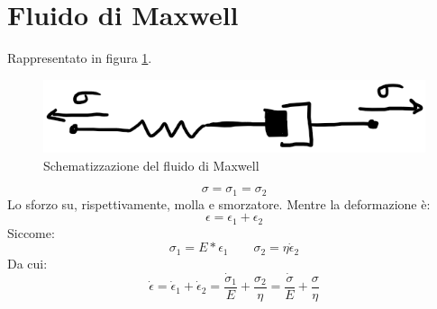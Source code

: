 \section{Fluido di Maxwell}
Rappresentato in figura \ref{fig:FluidoMaxwell}.
\begin{figure}
\centering
\includegraphics[width = \textwidth]{gfx/FluidoMaxwell}
\caption{Schematizzazione del fluido di Maxwell}
\label{fig:FluidoMaxwell}
\end{figure}

\begin{equation}
\sigma = \sigma_1 = \sigma_2
\end{equation}
Lo sforzo su, rispettivamente, molla e smorzatore.
Mentre la deformazione è:
\begin{equation}
\epsilon = \epsilon_1 + \epsilon_2
\end{equation}
Siccome:
\begin{equation}
\sigma_1 = E*\epsilon_1 \qquad \sigma_2=\eta \dot{\epsilon}_2
\end{equation}
Da cui:
\begin{equation}
\dot{\epsilon} = \dot{\epsilon}_1 + \dot{\epsilon}_2 = \frac{\dot{\sigma}_1}{E} + \frac{\sigma_2}{\eta} = \frac{\dot{\sigma}}{E} + \frac{\sigma}{\eta}
\end{equation}

